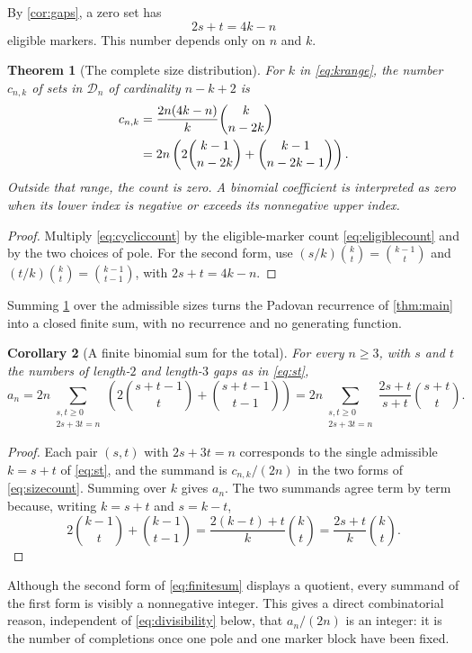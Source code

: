 \documentclass[11pt,letterpaper]{article}
\numberwithin{equation}{section}
\newtheorem{theorem}{Theorem}[section]
\newtheorem{corollary}[theorem]{Corollary}
\theoremstyle{definition}
\newcommand{\CM}{\mathcal D}
\newcommand{\1}{\mathbf 1}
\begin{document}
By \cref{cor:gaps}, a zero set has
\begin{equation}\label{eq:eligiblecount}
 2s+t=4k-n
\end{equation}
eligible markers. This number depends only on $n$ and $k$.

\begin{theorem}[The complete size distribution]\label{thm:size}
For $k$ in \eqref{eq:krange}, the number $c_{n,k}$ of sets in $\CM_n$ of
cardinality $n-k+2$ is
\begin{align}\label{eq:sizecount}
 c_{n,k}
 &=\frac{2n(4k-n)}{k}\binom{k}{n-2k}\\
 &=2n\left(2\binom{k-1}{n-2k}+\binom{k-1}{n-2k-1}\right).\notag
\end{align}
Outside that range, the count is zero. A binomial coefficient is interpreted
as zero when its lower index is negative or exceeds its nonnegative upper index.
\end{theorem}
\begin{proof}
Multiply \eqref{eq:cycliccount} by the eligible-marker count
\eqref{eq:eligiblecount} and by the two choices of pole. For the second form,
use $(s/k)\binom{k}{t}=\binom{k-1}{t}$ and
$(t/k)\binom{k}{t}=\binom{k-1}{t-1}$, with $2s+t=4k-n$.
\end{proof}

Summing \cref{thm:size} over the admissible sizes turns the Padovan recurrence
of \cref{thm:main} into a closed finite sum, with no recurrence and no
generating function.

\begin{corollary}[A finite binomial sum for the total]\label{cor:finitesum}
For every $n\ge3$, with $s$ and $t$ the numbers of length-$2$ and length-$3$
gaps as in \eqref{eq:st},
\begin{equation}\label{eq:finitesum}
 a_n=2n\!\!\sum_{\substack{s,t\ge0\\2s+3t=n}}\!\!
 \left(2\binom{s+t-1}{t}+\binom{s+t-1}{t-1}\right)
 =2n\!\!\sum_{\substack{s,t\ge0\\2s+3t=n}}\!\!
 \frac{2s+t}{s+t}\binom{s+t}{t}.
\end{equation}
\end{corollary}
\begin{proof}
Each pair $(s,t)$ with $2s+3t=n$ corresponds to the single admissible
$k=s+t$ of \eqref{eq:st}, and the summand is $c_{n,k}/(2n)$ in the two forms
of \eqref{eq:sizecount}. Summing over $k$ gives $a_n$. The two summands agree
term by term because, writing $k=s+t$ and $s=k-t$,
\begin{equation}\label{eq:binomid}
 2\binom{k-1}{t}+\binom{k-1}{t-1}
 =\frac{2(k-t)+t}{k}\binom{k}{t}
 =\frac{2s+t}{k}\binom{k}{t}.
\end{equation}
\end{proof}
Although the second form of \eqref{eq:finitesum} displays a quotient, every
summand of the first form is visibly a nonnegative integer. This gives a direct
combinatorial reason, independent of \eqref{eq:divisibility} below, that
$a_n/(2n)$ is an integer: it is the number of completions once one pole and one
marker block have been fixed.
\end{document}
